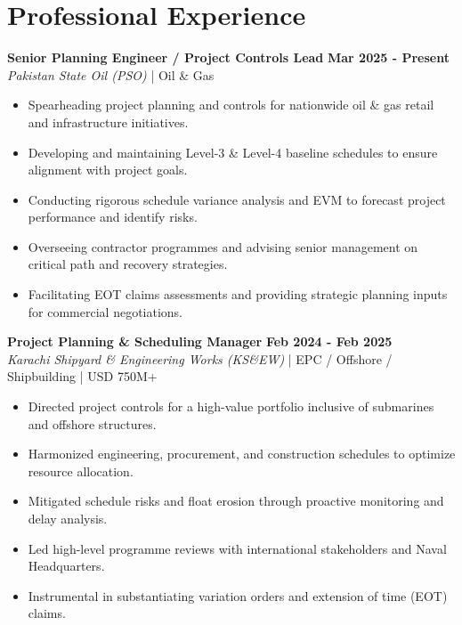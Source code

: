 \documentclass[11pt,a4paper]{article}
\begin{document}
\section{Professional Experience}
\noindent \textbf{\large Senior Planning Engineer / Project Controls Lead} \hfill \textbf{\color{awesome-blue}Mar 2025 - Present}\\
\textit{Pakistan State Oil (PSO)} | Oil \& Gas\\
\begin{itemize}
    \item Spearheading project planning and controls for nationwide oil \& gas retail and infrastructure initiatives.
    \item Developing and maintaining Level-3 \& Level-4 baseline schedules to ensure alignment with project goals.
    \item Conducting rigorous schedule variance analysis and EVM to forecast project performance and identify risks.
    \item Overseeing contractor programmes and advising senior management on critical path and recovery strategies.
    \item Facilitating EOT claims assessments and providing strategic planning inputs for commercial negotiations.
\end{itemize}

\noindent \textbf{\large Project Planning \& Scheduling Manager} \hfill \textbf{\color{awesome-blue}Feb 2024 - Feb 2025}\\
\textit{Karachi Shipyard \& Engineering Works (KS\&EW)} | EPC / Offshore / Shipbuilding | USD 750M+\\
\begin{itemize}
    \item Directed project controls for a high-value portfolio inclusive of submarines and offshore structures.
    \item Harmonized engineering, procurement, and construction schedules to optimize resource allocation.
    \item Mitigated schedule risks and float erosion through proactive monitoring and delay analysis.
    \item Led high-level programme reviews with international stakeholders and Naval Headquarters.
    \item Instrumental in substantiating variation orders and extension of time (EOT) claims.
\end{itemize}
\end{document}

